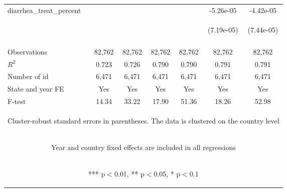 \documentclass{article}
\begin{document}
\begin{table}[htbp]
{\begin{tabular}{lcccccc}
diarrhea\_treat\_percent &  &  &  &  & -5.26e-05 & -4.42e-05 \\
\vspace{4pt} & \begin{footnotesize}\end{footnotesize} & \begin{footnotesize}\end{footnotesize} & \begin{footnotesize}\end{footnotesize} & \begin{footnotesize}\end{footnotesize} & \begin{footnotesize}(7.19e-05)\end{footnotesize} & \begin{footnotesize}(7.44e-05)\end{footnotesize} \\
\vspace{4pt} & \begin{footnotesize}\end{footnotesize} & \begin{footnotesize}\end{footnotesize} & \begin{footnotesize}\end{footnotesize} & \begin{footnotesize}\end{footnotesize} & \begin{footnotesize}\end{footnotesize} & \begin{footnotesize}\end{footnotesize} \\
Observations & 82,762 & 82,762 & 82,762 & 82,762 & 82,762 & 82,762 \\
$R^2$ & 0.723 & 0.726 & 0.790 & 0.790 & 0.791 & 0.791 \\
Number of id & 6,471 & 6,471 & 6,471 & 6,471 & 6,471 & 6,471 \\
State and year FE & Yes & Yes & Yes & Yes & Yes & Yes \\
F-test & 14.34 & 33.22 & 17.90 & 51.36 & 18.26 & 52.98 \\ \hline
\multicolumn{7}{c}{\begin{footnotesize} Cluster-robust standard errors in parentheses. The data is clustered on the country level\end{footnotesize}} \\
\multicolumn{7}{c}{\begin{footnotesize} Year and country fixed effects are included in all regressions \end{footnotesize}} \\
\multicolumn{7}{c}{\begin{footnotesize} *** p$<$0.01, ** p$<$0.05, * p$<$0.1\end{footnotesize}} \\
\end{tabular}
}
\end{table}
\end{document}
